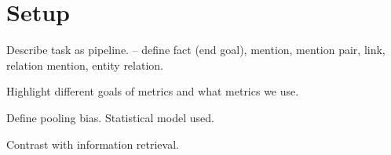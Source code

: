 \section{Setup}
\label{sec:setup}

Describe task as pipeline. -- define fact (end goal), mention, mention pair, link, relation mention, entity relation.

Highlight different goals of metrics and what metrics we use.

Define pooling bias. Statistical model used.

Contrast with information retrieval.
